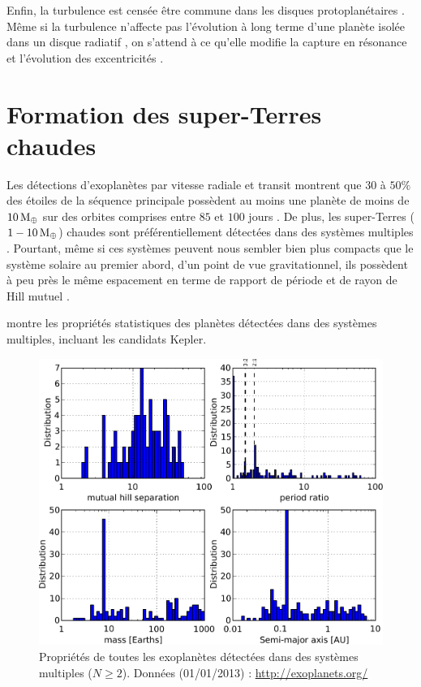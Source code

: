 Enfin, la turbulence est censée être commune dans les disques protoplanétaires \citep{armitage2011dynamics}. Même si la turbulence n'affecte pas l'évolution à long terme d'une planète isolée dans un disque radiatif \citep{pierens2012protoplanetary}, on s'attend à ce qu'elle modifie la capture en résonance et l'évolution des excentricités \citep[voir][]{pierens2011dynamics}.

\section{Formation des super-Terres chaudes}\label{sec:4.2}
Les détections d'exoplanètes par vitesse radiale et transit montrent que $30$ à $50\%$ des étoiles de la séquence principale possèdent au moins une planète de moins de $10\mathrm{\thinspace M_\oplus}$ sur des orbites comprises entre $85$ et $100$ jours \citep{mayor2011road, howard2010occurrence, howard2012occurrence, fressin2013false}. De plus, les super-Terres ($1-10\mathrm{\thinspace M_\oplus}$) chaudes sont préférentiellement détectées dans des systèmes multiples \citep{udry2007statistical, lissauer2011architecture}. Pourtant, même si ces systèmes peuvent nous sembler bien plus compacts que le système solaire au premier abord, d'un point de vue gravitationnel, ils possèdent à peu près le même espacement en terme de rapport de période et de rayon de Hill mutuel \citep{fang2013planetary}.


 montre les propriétés statistiques des planètes détectées dans des systèmes multiples, incluant les candidats Kepler.%

\begin{figure}[htb]
\centering
\includegraphics[width=0.8\linewidth]{figure/multiplanet_systems_stats.pdf}
\caption{Propriétés de toutes les exoplanètes détectées dans des systèmes multiples ($N\geqslant 2$). Données (01/01/2013) : \url{http://exoplanets.org/}}\label{fig:multiplanet_stats}
\end{figure}

